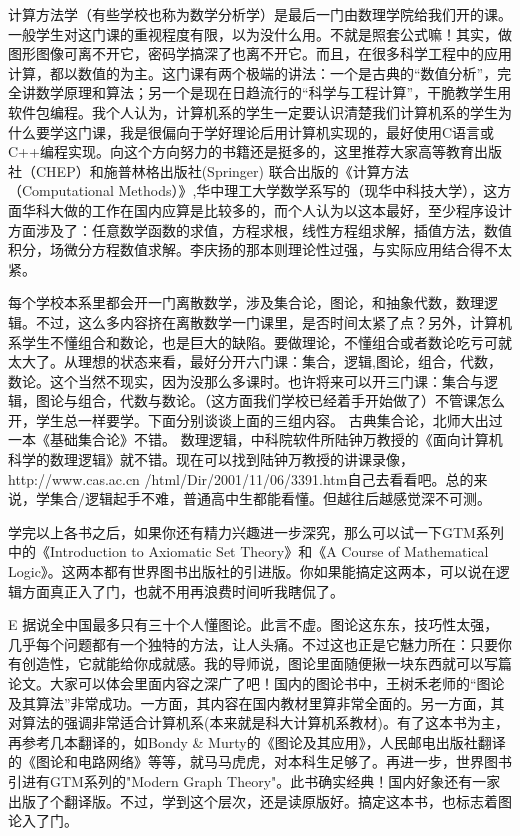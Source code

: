 计算方法学（有些学校也称为数学分析学）是最后一门由数理学院给我们开的课。一般学生对这门课的重视程度有限，以为没什么用。不就是照套公式嘛！其实，做图形图像可离不开它，密码学搞深了也离不开它。而且，在很多科学工程中的应用计算，都以数值的为主。这门课有两个极端的讲法：一个是古典的“数值分析”，完全讲数学原理和算法；另一个是现在日趋流行的“科学与工程计算”，干脆教学生用软件包编程。我个人认为，计算机系的学生一定要认识清楚我们计算机系的学生为什么要学这门课，我是很偏向于学好理论后用计算机实现的，最好使用C语言或C++编程实现。向这个方向努力的书籍还是挺多的，这里推荐大家高等教育出版社（CHEP）和施普林格出版社(Springer) 联合出版的《计算方法（Computational Methods）》,华中理工大学数学系写的（现华中科技大学），这方面华科大做的工作在国内应算是比较多的，而个人认为以这本最好，至少程序设计方面涉及了：任意数学函数的求值，方程求根，线性方程组求解，插值方法，数值积分，场微分方程数值求解。李庆扬的那本则理论性过强，与实际应用结合得不太紧。

每个学校本系里都会开一门离散数学，涉及集合论，图论，和抽象代数，数理逻辑。不过，这么多内容挤在离散数学一门课里，是否时间太紧了点？另外，计算机系学生不懂组合和数论，也是巨大的缺陷。要做理论，不懂组合或者数论吃亏可就太大了。从理想的状态来看，最好分开六门课：集合，逻辑,图论，组合，代数，数论。这个当然不现实，因为没那么多课时。也许将来可以开三门课：集合与逻辑，图论与组合，代数与数论。（这方面我们学校已经着手开始做了）不管课怎么开，学生总一样要学。下面分别谈谈上面的三组内容。
古典集合论，北师大出过一本《基础集合论》不错。 数理逻辑，中科院软件所陆钟万教授的《面向计算机科学的数理逻辑》就不错。现在可以找到陆钟万教授的讲课录像，http://www.cas.ac.cn /html/Dir/2001/11/06/3391.htm自己去看看吧。总的来说，学集合/逻辑起手不难，普通高中生都能看懂。但越往后越感觉深不可测。

学完以上各书之后，如果你还有精力兴趣进一步深究，那么可以试一下GTM系列中的《Introduction to Axiomatic Set Theory》和《A Course of Mathematical Logic》。这两本都有世界图书出版社的引进版。你如果能搞定这两本，可以说在逻辑方面真正入了门，也就不用再浪费时间听我瞎侃了。

E
据说全中国最多只有三十个人懂图论。此言不虚。图论这东东，技巧性太强，几乎每个问题都有一个独特的方法，让人头痛。不过这也正是它魅力所在：只要你有创造性，它就能给你成就感。我的导师说，图论里面随便揪一块东西就可以写篇论文。大家可以体会里面内容之深广了吧！国内的图论书中，王树禾老师的“图论及其算法”非常成功。一方面，其内容在国内教材里算非常全面的。另一方面，其对算法的强调非常适合计算机系(本来就是科大计算机系教材)。有了这本书为主，再参考几本翻译的，如Bondy \& Murty的《图论及其应用》，人民邮电出版社翻译的《图论和电路网络》等等，就马马虎虎，对本科生足够了。再进一步，世界图书引进有GTM系列的"Modern Graph Theory"。此书确实经典！国内好象还有一家出版了个翻译版。不过，学到这个层次，还是读原版好。搞定这本书，也标志着图论入了门。

